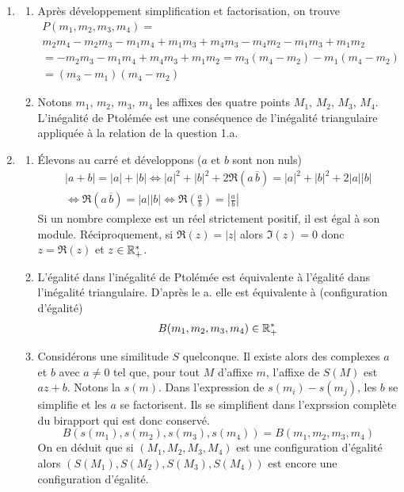 \begin{enumerate}
 \item 
\begin{enumerate}
 \item 
 Après développement simplification et factorisation, on trouve
\begin{multline*}
 P(m_1,m_2,m_3,m_4)=\\ m_2m_4 - m_2m_3 - m_1m_4 + m_1m_3 + m_4m_3 - m_4m_2 - m_1m_3 + m_1m_2\\
= - m_2m_3 - m_1m_4  + m_4m_3 + m_1m_2 
= m_3(m_4 -m_2) - m_1(m_4 - m_2)\\ =(m_3-m_1)(m_4-m_2) 
\end{multline*}

\item Notons $m_1$, $m_2$, $m_3$, $m_4$ les affixes des quatre points $M_1$, $M_2$, $M_3$, $M_4$.\newline
 L'inégalité de Ptolémée est une conséquence de l'inégalité triangulaire appliquée à la relation de la question 1.a.
\end{enumerate}

 \item 
\begin{enumerate}
 \item \'Elevons au carré et développons ($a$ et $b$ sont non  nuls)
\begin{multline*}
 |a+b| = |a|+|b|\Leftrightarrow |a|^2 + |b|^2 +2\Re(a\,\overline{b}) = |a|^2 + |b|^2 +2|a||b|\\
\Leftrightarrow \Re(a\,\overline{b}) = |a||b| \Leftrightarrow \Re(\frac{a}{b})= \left\vert \frac{a}{b}\right\vert
\end{multline*}
 Si un nombre complexe est un réel strictement positif, il est égal à son module. Réciproquement, si $\Re(z) = |z|$ alors $\Im(z)=0$ donc $z=\Re(z)$ et $z\in \mathbb{R}_+^*$.
 \item L'égalité dans l'inégalité de Ptolémée est équivalente à l'égalité dans l'inégalité triangulaire. D'après le a. elle est équivalente à (configuration d'égalité)
\begin{displaymath}
 B(m_1,m_2,m_3,m_4) \in \mathbb{R}_+^*
\end{displaymath}

 \item Considérons une similitude $S$ quelconque. Il existe alors des complexes $a$ et $b$ avec $a\neq0$ tel que, pour tout $M$ d'affixe $m$, l'affixe de $S(M)$ est $az+b$. Notons la $s(m)$. Dans l'expression de $s(m_i)-s(m_j)$, les $b$ se simplifie et les $a$ se factorisent. Ils se simplifient dans l'exprssion complète du birapport qui est donc conservé.
\begin{displaymath}
 B(s(m_1),s(m_2),s(m_3),s(m_4))= B(m_1,m_2,m_3,m_4)
\end{displaymath}
 On en déduit que si $(M_1,M_2,M_3,M_4)$ est une configuration d'égalité alors $(S(M_1),S(M_2),S(M_3),S(M_4))$ est encore une configuration d'égalité.
\end{enumerate}


\end{enumerate}
